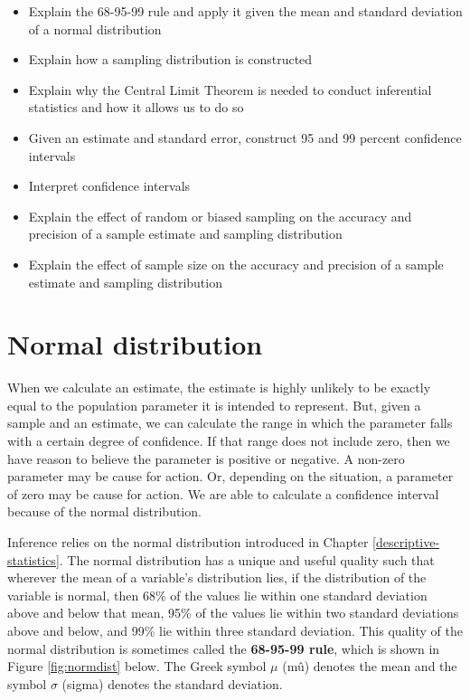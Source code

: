 \documentclass[
]{book}
\providecommand{\tightlist}{%
  \setlength{\itemsep}{0pt}\setlength{\parskip}{0pt}}
\begin{document}
\begin{itemize}
\tightlist
\item
  Explain the 68-95-99 rule and apply it given the mean and standard deviation of a normal distribution
\item
  Explain how a sampling distribution is constructed
\item
  Explain why the Central Limit Theorem is needed to conduct inferential statistics and how it allows us to do so
\item
  Given an estimate and standard error, construct 95 and 99 percent confidence intervals
\item
  Interpret confidence intervals
\item
  Explain the effect of random or biased sampling on the accuracy and precision of a sample estimate and sampling distribution
\item
  Explain the effect of sample size on the accuracy and precision of a sample estimate and sampling distribution
\end{itemize}

\hypertarget{normal-distribution}{%
\section{Normal distribution}\label{normal-distribution}}

When we calculate an estimate, the estimate is highly unlikely to be exactly equal to the population parameter it is intended to represent. But, given a sample and an estimate, we can calculate the range in which the parameter falls with a certain degree of confidence. If that range does not include zero, then we have reason to believe the parameter is positive or negative. A non-zero parameter may be cause for action. Or, depending on the situation, a parameter of zero may be cause for action. We are able to calculate a confidence interval because of the normal distribution.

Inference relies on the normal distribution introduced in Chapter \ref{descriptive-statistics}. The normal distribution has a unique and useful quality such that wherever the mean of a variable's distribution lies, if the distribution of the variable is normal, then 68\% of the values lie within one standard deviation above and below that mean, 95\% of the values lie within two standard deviations above and below, and 99\% lie within three standard deviation. This quality of the normal distribution is sometimes called the \textbf{68-95-99 rule}, which is shown in Figure \ref{fig:normdist} below. The Greek symbol \(\mu\) (mû) denotes the mean and the symbol \(\sigma\) (sigma) denotes the standard deviation.
\end{document}
